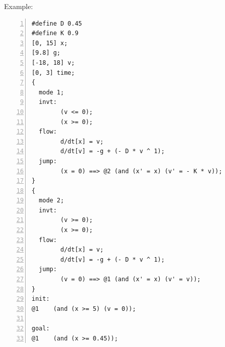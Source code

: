 
Example:

\begin{Verbatim}[fontfamily=courier, frame=single, framesep=5mm, numbers=left, fontsize=\footnotesize]
#define D 0.45
#define K 0.9
[0, 15] x;
[9.8] g;
[-18, 18] v;
[0, 3] time;
{
  mode 1;
  invt:
        (v <= 0);
        (x >= 0);
  flow:
        d/dt[x] = v;
        d/dt[v] = -g + (- D * v ^ 1);
  jump:
        (x = 0) ==> @2 (and (x' = x) (v' = - K * v));
}
{
  mode 2;
  invt:
        (v >= 0);
        (x >= 0);
  flow:
        d/dt[x] = v;
        d/dt[v] = -g + (- D * v ^ 1);
  jump:
        (v = 0) ==> @1 (and (x' = x) (v' = v));
}
init:
@1    (and (x >= 5) (v = 0));

goal:
@1    (and (x >= 0.45));
\end{Verbatim}


